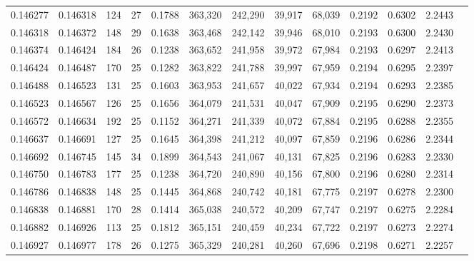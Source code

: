 \begin{tabular}{rrrrrrrrrrrrr}
0.146277 & 0.146318 & 124 &  27 &                                     0.1788 & 363,320 & 242,290 &  39,917 &  68,039 & 0.2192 & 0.6302 & 2.2443 \\
0.146318 & 0.146372 & 148 &  29 &                                     0.1638 & 363,468 & 242,142 &  39,946 &  68,010 & 0.2193 & 0.6300 & 2.2430 \\
0.146374 & 0.146424 & 184 &  26 &                                     0.1238 & 363,652 & 241,958 &  39,972 &  67,984 & 0.2193 & 0.6297 & 2.2413 \\
0.146424 & 0.146487 & 170 &  25 &                                     0.1282 & 363,822 & 241,788 &  39,997 &  67,959 & 0.2194 & 0.6295 & 2.2397 \\
0.146488 & 0.146523 & 131 &  25 &                                     0.1603 & 363,953 & 241,657 &  40,022 &  67,934 & 0.2194 & 0.6293 & 2.2385 \\
0.146523 & 0.146567 & 126 &  25 &                                     0.1656 & 364,079 & 241,531 &  40,047 &  67,909 & 0.2195 & 0.6290 & 2.2373 \\
0.146572 & 0.146634 & 192 &  25 &                                     0.1152 & 364,271 & 241,339 &  40,072 &  67,884 & 0.2195 & 0.6288 & 2.2355 \\
0.146637 & 0.146691 & 127 &  25 &                                     0.1645 & 364,398 & 241,212 &  40,097 &  67,859 & 0.2196 & 0.6286 & 2.2344 \\
0.146692 & 0.146745 & 145 &  34 &                                     0.1899 & 364,543 & 241,067 &  40,131 &  67,825 & 0.2196 & 0.6283 & 2.2330 \\
0.146750 & 0.146783 & 177 &  25 &                                     0.1238 & 364,720 & 240,890 &  40,156 &  67,800 & 0.2196 & 0.6280 & 2.2314 \\
0.146786 & 0.146838 & 148 &  25 &                                     0.1445 & 364,868 & 240,742 &  40,181 &  67,775 & 0.2197 & 0.6278 & 2.2300 \\
0.146838 & 0.146881 & 170 &  28 &                                     0.1414 & 365,038 & 240,572 &  40,209 &  67,747 & 0.2197 & 0.6275 & 2.2284 \\
0.146882 & 0.146926 & 113 &  25 &                                     0.1812 & 365,151 & 240,459 &  40,234 &  67,722 & 0.2197 & 0.6273 & 2.2274 \\
0.146927 & 0.146977 & 178 &  26 &                                     0.1275 & 365,329 & 240,281 &  40,260 &  67,696 & 0.2198 & 0.6271 & 2.2257 \\

\end{tabular}
